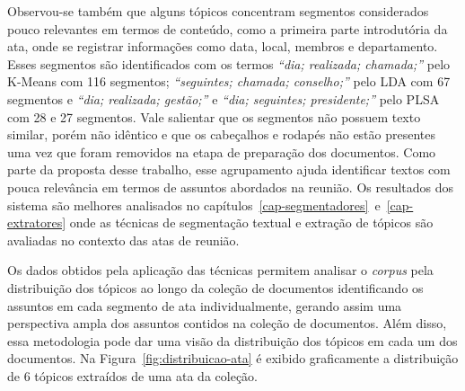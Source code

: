 Observou-se também que alguns tópicos concentram segmentos considerados pouco relevantes em termos de conteúdo, como a primeira parte introdutória da ata, onde se registrar informações como data, local, membros e departamento. Esses segmentos são identificados com os termos 
\textit{``dia; realizada; chamada;''} pelo K-Means com 116 segmentos; 
\textit{``seguintes; chamada; conselho;''} pelo LDA com 67 segmentos e 
\textit{``dia; realizada; gestão;''} e \textit{``dia; seguintes; presidente;''} pelo PLSA com 28 e 27 segmentos. Vale salientar que os segmentos não possuem texto similar, porém não idêntico e que os cabeçalhos e rodapés não estão presentes uma vez que foram removidos na etapa de preparação dos documentos. Como parte da proposta desse trabalho, esse agrupamento ajuda identificar textos com pouca relevância em termos de assuntos abordados na reunião.
Os resultados dos sistema são melhores analisados no capítulos~\ref{cap-segmentadores}~e~\ref{cap-extratores} onde as técnicas de segmentação textual e extração de tópicos são avaliadas no contexto das atas de reunião.


Os dados obtidos pela aplicação das técnicas permitem analisar o \textit{corpus} pela distribuição dos tópicos ao longo da coleção de documentos identificando os assuntos em cada segmento de ata individualmente, gerando assim uma perspectiva ampla dos assuntos contidos na coleção de documentos. Além disso, essa metodologia pode dar uma visão da distribuição dos tópicos em cada um dos documentos. Na Figura~\ref{fig:distribuicao-ata} é exibido graficamente a distribuição de 6 tópicos extraídos de uma ata da coleção. 



